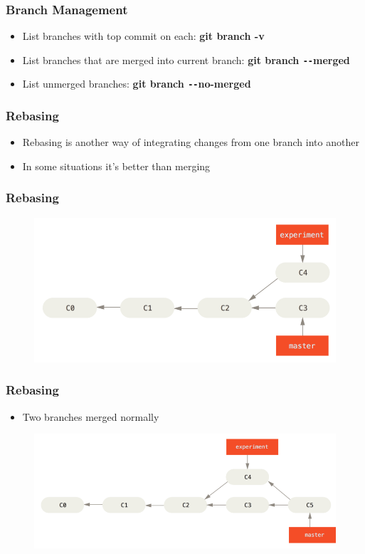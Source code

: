 \documentclass{beamer}
\begin{document}
\begin{frame}
	\frametitle{Branch Management}
	\begin{itemize}
		\item{List branches with top commit on each: \textbf{git branch -v}}
		\item{List branches that are merged into current branch: \textbf{git branch \texttt{-{}-}merged}}
		\item{List unmerged branches: \textbf{git branch \texttt{-{}-}no-merged}}
	\end{itemize}
\end{frame}

\begin{frame}
	\frametitle{Rebasing}
	\begin{itemize}
		\item{Rebasing is another way of integrating changes from one branch into another}
		\item{In some situations it's better than merging}
	\end{itemize}
\end{frame}

\begin{frame}
	\frametitle{Rebasing}
	\begin{figure}
		\includegraphics[scale=0.4]{Rebasing-0.png}
	\end{figure}
\end{frame}

\begin{frame}
	\frametitle{Rebasing}
	\begin{itemize}
		\item{Two branches merged normally}
	\end{itemize}
	\begin{figure}
		\includegraphics[scale=0.4]{Rebasing-1.png}
	\end{figure}
\end{frame}
\end{document}
